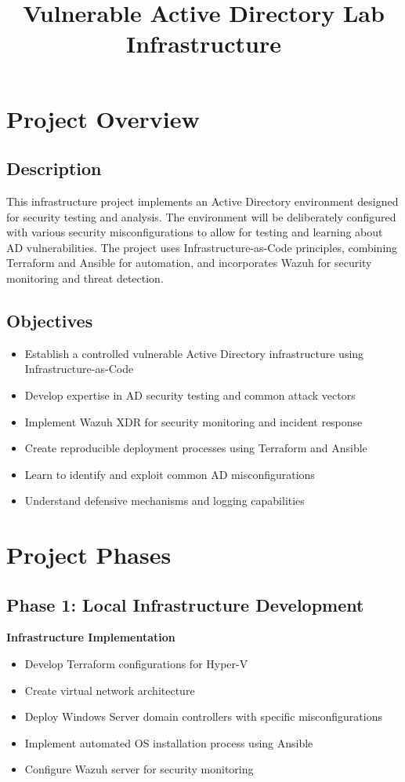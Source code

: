 \documentclass[11pt,a4paper]{article}
\title{\textbf{Vulnerable Active Directory Lab Infrastructure}}
\begin{document}
\maketitle

\section{Project Overview}
\subsection{Description}
This infrastructure project implements an Active Directory environment designed for security testing and analysis. The environment will be deliberately configured with various security misconfigurations to allow for testing and learning about AD vulnerabilities. The project uses Infrastructure-as-Code principles, combining Terraform and Ansible for automation, and incorporates Wazuh for security monitoring and threat detection.

\subsection{Objectives}
\begin{itemize}
    \item Establish a controlled vulnerable Active Directory infrastructure using Infrastructure-as-Code
    \item Develop expertise in AD security testing and common attack vectors
    \item Implement Wazuh XDR for security monitoring and incident response
    \item Create reproducible deployment processes using Terraform and Ansible
    \item Learn to identify and exploit common AD misconfigurations
    \item Understand defensive mechanisms and logging capabilities
\end{itemize}

\section{Project Phases}

\subsection{Phase 1: Local Infrastructure Development}
\textbf{Infrastructure Implementation}
\begin{itemize}
    \item Develop Terraform configurations for Hyper-V
    \item Create virtual network architecture
    \item Deploy Windows Server domain controllers with specific misconfigurations
    \item Implement automated OS installation process using Ansible
    \item Configure Wazuh server for security monitoring
\end{itemize}
\end{document}
